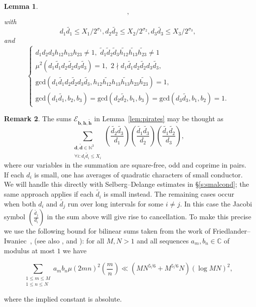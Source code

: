 \documentclass[a4paper,12pt,reqno]{amsart}
\numberwithin{equation}{section} \numberwithin{figure}{section}
\newcommand\N{\mathbb{N}}
\renewcommand{\l}{\left}
\renewcommand{\r}{\right}
\renewcommand{\b}{\mathbf}
\renewcommand{\c}{\mathcal}
\renewcommand{\gcd}{\textrm{gcd}}
\renewcommand{\leq}{\leqslant}
\renewcommand{\#}{\sharp}
\newtheorem{lemma}{Lemma}
\theoremstyle{definition}
\newtheorem{remark}[lemma]{Remark}
\numberwithin{lemma}{section}
\newcommand{\beq}[2]
{
\begin{equation}
\label{#1}
{#2}
\end{equation}
}
\begin{document}
\begin{lemma}
\begin{align*}
,\end{align*}
 with    
  \begin{equation}\label {eq:Blnbc93fdty}
  d_1     \widetilde{d_1}     \leq  X_1/2^{\sigma_1}  ,
  d_2  \widetilde{d_2}    \leq   X_2/2^{\sigma_2}  ,
  d_3  \widetilde{d_3}    \leq   X_3/2^{\sigma_3}  ,\end{equation} and 
  \begin{equation}
\label{eq:degh93vxz}  
\begin{cases} 
d_1 d_2 d_3  h_{12}h_{13}h_{23} \neq 1, \,\, \widetilde d_1  \widetilde d_2 \widetilde d_3
\widetilde {h_{12}}\widetilde {h_{13}}\widetilde {h_{23}} \neq 1
\\
\mu^2( d_1 \widetilde{d_1}   d_2 \widetilde{d_2}     d_3 \widetilde{d_3}    )  =1,  \,\,
 2\nmid  d_1 \widetilde{d_1}   d_2 \widetilde{d_2}     d_3 \widetilde{d_3}   ,    \\
\gcd( d_1 \widetilde{d_1} d_2 \widetilde{d_2} d_3 \widetilde{d_3} , 
        h_{12}\widetilde{h_{12}} h_{13} \widetilde{h_{13}} h_{23} \widetilde{h_{23}})
=1,
\\   \gcd( d_1 \widetilde{d_1}  , b_2, b_3) 
= \gcd( 
 d_2 \widetilde{d_2}  , b_1, b_3)
= \gcd( 
  d_3 \widetilde{d_3}  
 , b_1, b_2) =1 . \end{cases}
 \end{equation} \end{lemma}\begin{remark}\label{remrk:strgh8}
 The sums $\c E_{\b b , \b h , \widetilde {\b h } } $ in Lemma~\ref{lem:pirates} 
may be thought as \[
\sum_{\substack{ \b d , \widetilde{\b d } \in \N^3   \\ \forall i:  d_i \widetilde {d_i } \leq X_i   }}
\l( \frac{\widetilde {d_2 }  \widetilde {d_3 } }{d_1 } \r) 
\l( \frac{\widetilde {d_1 } \widetilde {d_3 } }{d_2 } \r) 
\l( \frac{\widetilde {d_1 } \widetilde {d_2 }  }{d_3 } \r) , \] where our variables in the summation are square-free, odd and coprime in pairs.
If each  $d_i $ is  small, 
 one has  averages of quadratic characters  of small conductor. We will handle this       directly with Selberg--Delange estimates in \S\ref{s:smalcond};
the same approach applies if  each  $\widetilde{ d_i }$ is small instead.  The remaining cases occur when both 
$ d_i$ and $ \widetilde {d_j}  $  run over long intervals 
for some $i\neq j $. In this case the Jacobi symbol $(\frac{\widetilde {d_j} }{d_i})$
  in the sum above will give rise to   cancellation. To make this precise we use the following bound for bilinear sums
taken from the work of Friedlander--Iwaniec~\cite[Lemma 2]{MR2675875},
(see also  \cite{MR97362}, \cite[Corollary 4]{MR1347489} and \cite[\S 21]{MR1670065}): for all 
$M, N > 1 $ and   all sequences $a_m, b_n \in \mathbb C$ of modulus at most $1$   we have 
\beq{eq:bilinear}
{\sum_{\substack{ 1\leq m\leq M 
\\
1\leq n \leq N 
}} a_m b_n \mu(2 mn)^2 \left( \frac{m }{n } \right) 
\ll  (MN^{5/6}+M^{5/6} N) (\log  MN)^{2} ,}
where the implied constant is absolute.
\end{remark}
\end{document}
